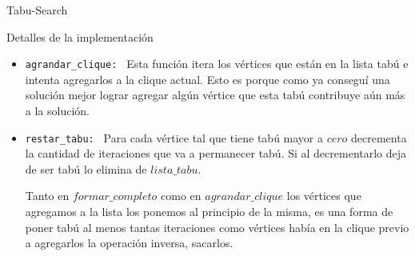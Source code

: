 \begin{section}{Tabu-Search}
\begin{subsection}{Detalles de la implementación}
\begin{itemize}
			\begin{itemize}
				\item \texttt{Observación: } Al agregar condicionamos la clique resultante al igual que pasa al sacar sin hacer rotaciones (depende del orden en que lo hagamos la calidad de la solución). Es decir, encontrar una mejor solución depende del orden en que agreguemos los vértices, podriamos también hacer rotaciones para agregar pero esto aumentaría en $n$ la complejidad. Buscando un equilibrio entre eficiencia y calidad de la solución, decidimos que hacer ambas rotaciones (agregar, sacar) tenia una complejidad mayor a la que pretendemos aceptar, no hacer ninguno implica perdernos de encontrar mejores soluciones y obtener así soluciones muy precarias. Entonces elegimos arbitrariamente hacer las rotaciones sólo para sacar.

				\item \texttt{Observacion: } Si el algoritmo vuelve a la solución inicial y todavía le restan iteraciones del \texttt{while} anidado, queremos evitar que repita exactamente el mismo procedimiento pasando nuevamente por soluciones ya visitadas
			\end{itemize}

			\item \texttt{agrandar\_clique: } Esta función itera los vértices que están en la lista tabú e intenta agregarlos a la clique actual. Esto es porque como ya conseguí una solución mejor lograr agregar algún vértice que esta tabú contribuye aún más a la solución.

			\item \texttt{restar\_tabu: } Para cada vértice tal que tiene tabú mayor a $cero$ decrementa la cantidad de iteraciones que va a permanecer tabú. Si al decrementarlo deja de ser tabú lo elimina de $lista\_tabu$.

			Tanto en $formar\_completo$ como en $agrandar\_clique$ los vértices que agregamos a la lista los ponemos al principio de la misma, es una forma de poner tabú al menos tantas iteraciones como vértices había en la clique previo a agregarlos la operación inversa, sacarlos.
		\end{itemize}
	\end{subsection}


\end{section}
